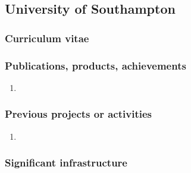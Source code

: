 \subsection*{University of Southampton}



\subsubsection*{Curriculum vitae}


%
%
%

\subsubsection*{Publications, products, achievements}

\begin{enumerate}
\item {}
\end{enumerate}

\subsubsection*{Previous projects or activities}

\begin{enumerate}
\item {}
\end{enumerate}

\subsubsection*{Significant infrastructure}

